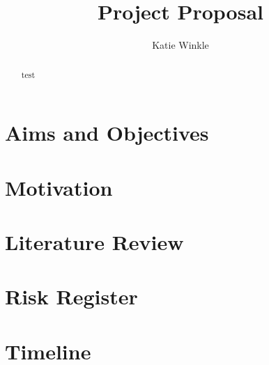 \documentclass[]{article}
\title{Project Proposal}
\author{Katie Winkle}
\begin{document}
\maketitle

\begin{abstract}
test
\end{abstract}

\tableofcontents

\section{Aims and Objectives}
\section{Motivation}
\section{Literature Review}

\section{Risk Register}
\section{Timeline}
\end{document}
